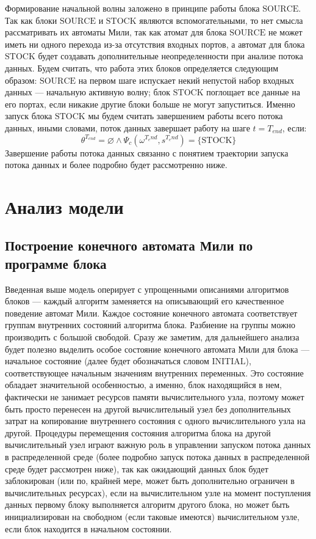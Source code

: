 \documentclass[10pt,a4paper]{article}
\newcommand{\stock}{\text{STOCK}}
\newcommand{\source}{\text{SOURCE}}
\newcommand{\initial}{\text{INITIAL}}
\begin{document}
  Формирование начальной волны заложено в принципе работы блока $\source$.
  Так как блоки $\source$ и $\stock$ являются вспомогательными, то нет смысла рассматривать их автоматы Мили, так как атомат для блока $\source$ не может иметь ни одного перехода
  из-за отсутствия входных портов, а автомат для блока $\stock$ будет создавать дополнительные неопределенности при анализе потока данных.
  Будем считать, что работа этих блоков определяется следующим образом: $\source$ на первом шаге испускает некий непустой набор входных данных --- начальную активную волну;
  блок $\stock$ поглощает все данные на его портах, если никакие другие блоки больше не могут запуститься. Именно запуск блока $\stock$ мы будем считать завершением работы
  всего потока данных, иными словами, поток данных завершает работу на шаге $t = T_{end}$, если:
  \begin{equation}
    \theta^{T_{end}} = \varnothing \wedge \Psi_c(\omega^{T_end}, s^{T_end}) = \{\stock\}
    \label{end_of_workflow}
  \end{equation}
  Завершение работы потока данных связанно с понятием траектории запуска потока данных и более подробно будет рассмотренно ниже.

\section{Анализ модели}
\subsection{Построение конечного автомата Мили по программе блока}
Введенная выше модель оперирует с упрощенными описаниями алгоритмов блоков --- каждый алгоритм заменяется на описывающий его качественное поведение автомат Мили.
Каждое состояние конечного автомата соответствует группам внутренних состояний алгоритма блока. Разбиение на группы можно производить с большой свободой.
Сразу же заметим, для дальнейшего анализа будет полезно выделить особое состояние конечного автомата Мили для блока --- начальное состояние (далее будет обозначаться словом $\initial$), соответствующее начальным значениям внутренних переменных. Это состояние обладает значительной особенностью, а именно, блок находящийся в нем, фактически
не занимает ресурсов памяти вычислительного узла, поэтому может быть просто перенесен на другой вычислительный узел без дополнительных затрат
на копирование внутреннего состояния с одного вычислительного узла на другой. Процедуры перемещения состояния алгоритма блока на другой
вычислительный узел играют важную роль в управлении запуском потока данных в распределенной среде (более подробно запуск потока данных в распределенной среде будет рассмотрен ниже), так как ожидающий данных блок будет заблокирован (или по, крайней мере, может быть дополнительно ограничен в вычислительных ресурсах),
если на вычислительном узле на момент поступления данных первому блоку выполняется алгоритм другого блока, но может быть инициализирован на свободном
(если таковые имеются) вычислительном узле, если блок находится в начальном состоянии.
\end{document}
